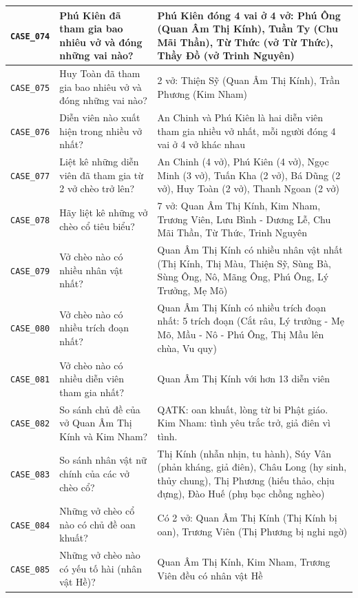 \begin{longtable}{|p{1.9cm}|p{5.2cm}|p{7.3cm}|}
  \hline
  \texttt{CASE\_074} & Phú Kiên đã tham gia bao nhiêu vở và đóng những vai nào? & Phú Kiên đóng 4 vai ở 4 vở: Phú Ông (Quan Âm Thị Kính), Tuần Ty (Chu Mãi Thần), Từ Thức (vở Từ Thức), Thầy Đồ (vở Trinh Nguyên) \\
  \hline
  \texttt{CASE\_075} & Huy Toàn đã tham gia bao nhiêu vở và đóng những vai nào? & 2 vở: Thiện Sỹ (Quan Âm Thị Kính), Trần Phương (Kim Nham) \\
  \hline
  \texttt{CASE\_076} & Diễn viên nào xuất hiện trong nhiều vở nhất? & An Chinh và Phú Kiên là hai diễn viên tham gia nhiều vở nhất, mỗi người đóng 4 vai ở 4 vở khác nhau \\
  \hline
  \texttt{CASE\_077} & Liệt kê những diễn viên đã tham gia từ 2 vở chèo trở lên? & An Chinh (4 vở), Phú Kiên (4 vở), Ngọc Minh (3 vở), Tuấn Kha (2 vở), Bá Dũng (2 vở), Huy Toàn (2 vở), Thanh Ngoan (2 vở) \\
  \hline
  \texttt{CASE\_078} & Hãy liệt kê những vở chèo cổ tiêu biểu? & 7 vở: Quan Âm Thị Kính, Kim Nham, Trương Viên, Lưu Bình - Dương Lễ, Chu Mãi Thần, Từ Thức, Trinh Nguyên \\
  \hline
  \texttt{CASE\_079} & Vở chèo nào có nhiều nhân vật nhất? & Quan Âm Thị Kính có nhiều nhân vật nhất (Thị Kính, Thị Màu, Thiện Sỹ, Sùng Bà, Sùng Ông, Nô, Mãng Ông, Phú Ông, Lý Trưởng, Mẹ Mõ) \\
  \hline
  \texttt{CASE\_080} & Vở chèo nào có nhiều trích đoạn nhất? & Quan Âm Thị Kính có nhiều trích đoạn nhất: 5 trích đoạn (Cắt râu, Lý trưởng - Mẹ Mõ, Mầu - Nô - Phú Ông, Thị Mầu lên chùa, Vu quy) \\
  \hline
  \texttt{CASE\_081} & Vở chèo nào có nhiều diễn viên tham gia nhất? & Quan Âm Thị Kính với hơn 13 diễn viên \\
  \hline
  \texttt{CASE\_082} & So sánh chủ đề của vở Quan Âm Thị Kính và Kim Nham? & QATK: oan khuất, lòng từ bi Phật giáo. Kim Nham: tình yêu trắc trở, giả điên vì tình. \\
  \hline
  \texttt{CASE\_083} & So sánh nhân vật nữ chính của các vở chèo cổ? & Thị Kính (nhẫn nhịn, tu hành), Súy Vân (phản kháng, giả điên), Châu Long (hy sinh, thủy chung), Thị Phương (hiếu thảo, chịu đựng), Đào Huế (phụ bạc chồng nghèo) \\
  \hline
  \texttt{CASE\_084} & Những vở chèo cổ nào có chủ đề oan khuất? & Có 2 vở: Quan Âm Thị Kính (Thị Kính bị oan), Trương Viên (Thị Phương bị nghi ngờ) \\
  \hline
  \texttt{CASE\_085} & Những vở chèo nào có yếu tố hài (nhân vật Hề)? & Quan Âm Thị Kính, Kim Nham, Trương Viên đều có nhân vật Hề \\

\end{longtable}
